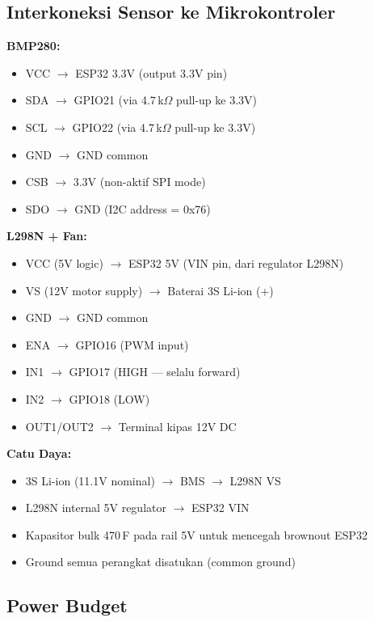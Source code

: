 \documentclass[11pt,a4paper]{article}
\begin{document}
\subsection{Interkoneksi Sensor ke Mikrokontroler}

\textbf{BMP280:}
\begin{itemize}
    \item VCC $\rightarrow$ ESP32 3.3V (output 3.3V pin)
    \item SDA $\rightarrow$ GPIO21 (via 4.7\,k$\Omega$ pull-up ke 3.3V)
    \item SCL $\rightarrow$ GPIO22 (via 4.7\,k$\Omega$ pull-up ke 3.3V)
    \item GND $\rightarrow$ GND common
    \item CSB $\rightarrow$ 3.3V (non-aktif SPI mode)
    \item SDO $\rightarrow$ GND (I2C address = 0x76)
\end{itemize}

\textbf{L298N + Fan:}
\begin{itemize}
    \item VCC (5V logic) $\rightarrow$ ESP32 5V (VIN pin, dari regulator L298N)
    \item VS (12V motor supply) $\rightarrow$ Baterai 3S Li-ion (+)
    \item GND $\rightarrow$ GND common
    \item ENA $\rightarrow$ GPIO16 (PWM input)
    \item IN1 $\rightarrow$ GPIO17 (HIGH --- selalu forward)
    \item IN2 $\rightarrow$ GPIO18 (LOW)
    \item OUT1/OUT2 $\rightarrow$ Terminal kipas 12V DC
\end{itemize}

\textbf{Catu Daya:}
\begin{itemize}
    \item 3S Li-ion (11.1V nominal) $\rightarrow$ BMS $\rightarrow$ L298N VS
    \item L298N internal 5V regulator $\rightarrow$ ESP32 VIN
    \item Kapasitor bulk 470\,\textmu F pada rail 5V untuk mencegah brownout ESP32
    \item Ground semua perangkat disatukan (common ground)
\end{itemize}

\subsection{Power Budget}
\end{document}
